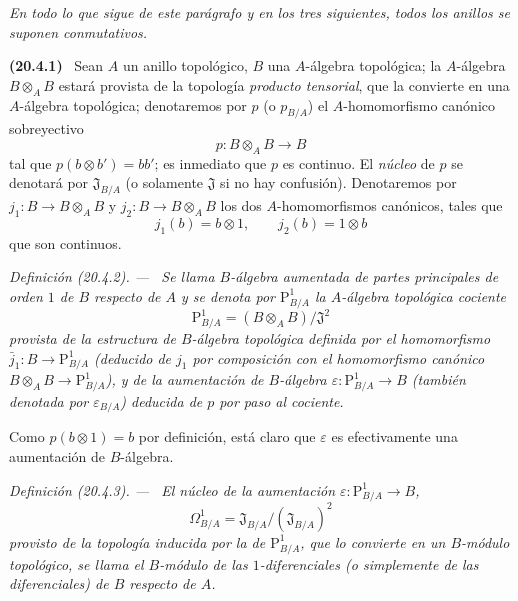 \documentclass[10pt,oneside]{book}
\makeatletter
\newcommand{\setmanualcurrentlabel}[1]{\def\@currentlabel{#1}}
\newcommand{\oldpage}[2][]{%
  \setcounter{footnote}{0}%
  \marginpar{\scriptsize\textbf{#1}~|~#2}\ignorespaces}
\newenvironment{env}[1][]{\setmanualcurrentlabel{#1}\par\medskip\noindent\textbf{(#1)}\ }{\par}
\newenvironment{definition}[1][]{%
  \setmanualcurrentlabel{#1}\par\medskip\noindent\itshape Definición (#1). ---\ }{\par}
\makeatother
\begin{document}
\textit{En todo lo que sigue de este parágrafo y en los tres siguientes, todos los
anillos se suponen conmutativos.}

\begin{env}[20.4.1]
\label{0.20.4.1-es}
Sean $A$ un anillo topológico, $B$ una $A$-álgebra topológica; la
$A$-álgebra $B\otimes_A B$ estará provista de la topología \emph{producto
tensorial}, que la convierte en una $A$-álgebra topológica; denotaremos por $p$
(o $p_{B/A}$) el $A$-homomorfismo canónico sobreyectivo
\begin{equation}
\tag{20.4.1.1}
\label{0.20.4.1.1-es}
  p:B\otimes_A B\to B
\end{equation}
tal que $p(b\otimes b')=bb'$; es inmediato que $p$ es continuo. El
\emph{núcleo} de $p$ se denotará por $\mathfrak{J}_{B/A}$ (o solamente
$\mathfrak{J}$ si no hay confusión). Denotaremos por
$j_1:B\to B\otimes_A B$ y $j_2:B\to B\otimes_A B$ los dos
$A$-homomorfismos canónicos, tales que
\[
  j_1(b)=b\otimes1, \qquad j_2(b)=1\otimes b
\]
que son continuos.
\end{env}

\oldpage[0\textsubscript{IV-1}]{124}
\begin{definition}[20.4.2]
\label{0.20.4.2-es}
Se llama $B$-álgebra aumentada de partes principales de orden $1$ de
$B$ respecto de $A$ y se denota por $\mathrm{P}^1_{B/A}$ la $A$-álgebra
topológica cociente
\begin{equation}
\tag{20.4.2.1}
\label{0.20.4.2.1-es}
  \mathrm{P}^1_{B/A}=(B\otimes_A B)/\mathfrak{J}^2
\end{equation}
provista de la estructura de $B$-álgebra topológica definida por el homomorfismo
$\bar{j}_1:B\to\mathrm{P}^1_{B/A}$ (deducido de $j_1$ por composición con
el homomorfismo canónico $B\otimes_A B\to\mathrm{P}^1_{B/A}$), y de
la aumentación de $B$-álgebra $\varepsilon:\mathrm{P}^1_{B/A}\to B$ (también
denotada por $\varepsilon_{B/A}$) deducida de $p$ por paso al cociente.

Como $p(b\otimes1)=b$ por definición, está claro que $\varepsilon$ es
efectivamente una aumentación de $B$-álgebra.
\end{definition}

\begin{definition}[20.4.3]
\label{0.20.4.3-es}
El núcleo de la aumentación $\varepsilon:\mathrm{P}^1_{B/A}\to B$,
\begin{equation}
\tag{20.4.3.1}
\label{0.20.4.3.1-es}
  \Omega^1_{B/A}=\mathfrak{J}_{B/A}/(\mathfrak{J}_{B/A})^2
\end{equation}
provisto de la topología inducida por la de $\mathrm{P}^1_{B/A}$, que lo convierte
en un $B$-módulo topológico, se llama el $B$-módulo de las
$1$-diferenciales \textup{(o simplemente de las} diferenciales) de $B$
respecto de $A$.
\end{definition}
\end{document}
